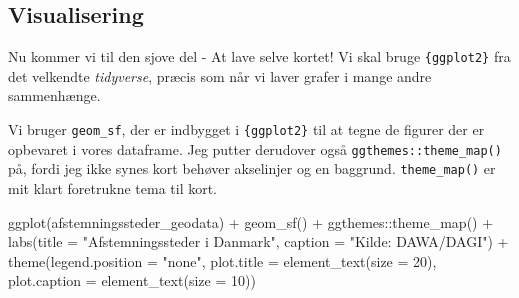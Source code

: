 \documentclass[
  a4paper,
  DIV=11,
  numbers=noendperiod,
  oneside]{scrartcl}
\newenvironment{Shaded}{\begin{snugshade}}{\end{snugshade}}
\newcommand{\AttributeTok}[1]{\textcolor[rgb]{0.40,0.45,0.13}{#1}}
\newcommand{\DecValTok}[1]{\textcolor[rgb]{0.68,0.00,0.00}{#1}}
\newcommand{\FunctionTok}[1]{\textcolor[rgb]{0.28,0.35,0.67}{#1}}
\newcommand{\NormalTok}[1]{\textcolor[rgb]{0.00,0.23,0.31}{#1}}
\newcommand{\SpecialCharTok}[1]{\textcolor[rgb]{0.37,0.37,0.37}{#1}}
\newcommand{\StringTok}[1]{\textcolor[rgb]{0.13,0.47,0.30}{#1}}
\begin{document}
\subsection{Visualisering}\label{visualisering}

Nu kommer vi til den sjove del - At lave selve kortet! Vi skal bruge
\texttt{\{ggplot2\}} fra det velkendte \emph{tidyverse}, præcis som når
vi laver grafer i mange andre sammenhænge.

Vi bruger \texttt{geom\_sf}, der er indbygget i \texttt{\{ggplot2\}} til
at tegne de figurer der er opbevaret i vores dataframe. Jeg putter
derudover også \texttt{ggthemes::theme\_map()} på, fordi jeg ikke synes
kort behøver akselinjer og en baggrund. \texttt{theme\_map()} er mit
klart foretrukne tema til kort.

\begin{Shaded}
\begin{Highlighting}[]
\FunctionTok{ggplot}\NormalTok{(afstemningssteder\_geodata) }\SpecialCharTok{+}
  \FunctionTok{geom\_sf}\NormalTok{() }\SpecialCharTok{+}
\NormalTok{  ggthemes}\SpecialCharTok{::}\FunctionTok{theme\_map}\NormalTok{() }\SpecialCharTok{+}
  \FunctionTok{labs}\NormalTok{(}\AttributeTok{title =} \StringTok{"Afstemningssteder i Danmark"}\NormalTok{,}
       \AttributeTok{caption =} \StringTok{"Kilde: DAWA/DAGI"}\NormalTok{) }\SpecialCharTok{+}
  \FunctionTok{theme}\NormalTok{(}\AttributeTok{legend.position =} \StringTok{"none"}\NormalTok{,}
        \AttributeTok{plot.title =} \FunctionTok{element\_text}\NormalTok{(}\AttributeTok{size =} \DecValTok{20}\NormalTok{),}
        \AttributeTok{plot.caption =} \FunctionTok{element\_text}\NormalTok{(}\AttributeTok{size =} \DecValTok{10}\NormalTok{))}
\end{Highlighting}
\end{Shaded}
\end{document}
